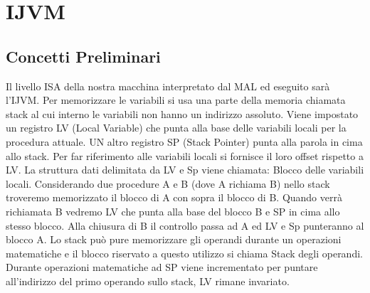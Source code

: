 \chapter{IJVM}
\section{Concetti Preliminari}
Il livello ISA della nostra macchina interpretato dal MAL ed eseguito sarà l'IJVM.
Per memorizzare le variabili si usa una parte della memoria chiamata stack al cui interno le variabili non hanno un indirizzo assoluto. Viene impostato un registro LV (Local Variable) che punta alla base delle variabili locali per la procedura attuale. UN altro registro SP (Stack Pointer) punta alla parola in cima allo stack. Per far riferimento alle variabili locali si fornisce il loro offset rispetto a LV. La struttura dati delimitata da LV e Sp viene chiamata: Blocco delle variabili locali. Considerando due procedure A e B (dove A richiama B) nello stack troveremo memorizzato il blocco di A con sopra il blocco di B. Quando verrà richiamata B vedremo LV che punta alla base del blocco B e SP in cima allo stesso blocco. Alla chiusura di B il controllo passa ad A ed LV e Sp punteranno al blocco A. Lo stack può pure memorizzare gli operandi durante un operazioni matematiche e il blocco riservato a questo utilizzo si chiama Stack degli operandi. Durante operazioni matematiche ad SP viene incrementato per puntare all'indirizzo del primo operando sullo stack, LV rimane invariato.
